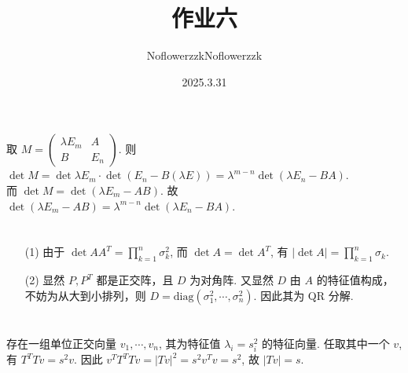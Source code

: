 \documentclass{article}
\title{作业六}
\author{NoflowerzzkNoflowerzzk}
\date{2025.3.31}
\begin{document}
\maketitle

\section{}

取 $M = \begin{pmatrix}
    \lambda E_m & A \\
    B & E_n
\end{pmatrix}$. 则 $\det M = \det \lambda E_m \cdot \det (E_n - B (\lambda E)) = \lambda^{m - n} \det (\lambda E_n - BA)$. \\
而 $\det M = \det(\lambda E_m - AB)$. 故 $\det (\lambda E_m - AB) = \lambda^{m - n}\det (\lambda E_n - BA)$.

\section{}

\begin{itemize}
    \item [(1)] 由于 $\det AA^T = \prod_{k = 1}^{n}\sigma_k^2$, 而 $\det A = \det A^T$, 有 $\left\lvert \det A\right\rvert = \prod_{k = 1}^{n}\sigma_k$. 
    \item [(2)] 显然 $P, P^T$ 都是正交阵，且 $D$ 为对角阵. 又显然 $D$ 由 $A$ 的特征值构成，不妨为从大到小排列，则 $D = \mathrm{diag} (\sigma_1^2, \cdots, \sigma_n^2)$. 因此其为 QR 分解.
\end{itemize}

\section{}

存在一组单位正交向量 $v_1, \cdots, v_n$, 其为特征值 $\lambda_i = s_i^2$ 的特征向量. 任取其中一个 $v$, 有 $T^TTv = s^2 v$. 因此 $v^TT^TTv = \left\lvert Tv\right\rvert^2 = s^2v^Tv = s^2$, 故 $\left\lvert Tv\right\rvert = s$.

\section{}
\end{document}

